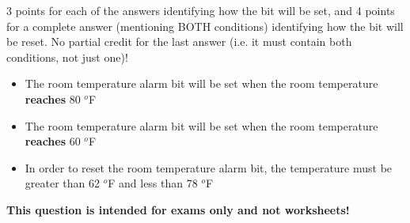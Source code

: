 
3 points for each of the answers identifying how the bit will be set, and 4 points for a complete answer (mentioning BOTH conditions) identifying how the bit will be reset.  No partial credit for the last answer (i.e. it must contain both conditions, not just one)!

\begin{itemize}
\item{} The room temperature alarm bit will be set when the room temperature {\bf reaches} 80 $^{o}$F
\vskip 10pt
\item{} The room temperature alarm bit will be set when the room temperature {\bf reaches} 60 $^{o}$F
\vskip 10pt
\item{} In order to reset the room temperature alarm bit, the temperature must be greater than 62 $^{o}$F and less than 78 $^{o}$F
\end{itemize}







{\bf This question is intended for exams only and not worksheets!}



